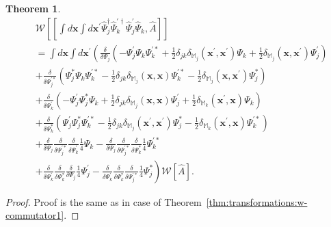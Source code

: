 \documentclass[12pt,aip,jmp,amssymb,amsmath]{revtex4-1}
\newtheorem{theorem}{Theorem}
\begin{document}
\begin{theorem}
\label{thm:transformations:w-commutator2}
    \begin{eqnarray*}
        & \mathcal{W} \left[
            [
                \int d\boldsymbol{x} \int d\boldsymbol{x}^\prime
                \hat{\Psi}_j^\dagger \hat{\Psi}_k^{\prime\dagger} \hat{\Psi}_j^\prime \hat{\Psi}_k,
                \hat{A}
            ]
        \right] \\
        & = \int d\boldsymbol{x} \int d\boldsymbol{x}^\prime \left(
            \frac{\delta}{\delta \Psi_j} \left(
                - \Psi_j^\prime \Psi_k \Psi_k^{\prime*}
                + \frac{1}{2} \delta_{jk} \delta_{\mathbb{M}_j}(\boldsymbol{x}^\prime, \boldsymbol{x}^\prime) \Psi_k
                + \frac{1}{2} \delta_{\mathbb{M}_j}(\boldsymbol{x}, \boldsymbol{x}^\prime) \Psi_j^\prime
            \right) \right . \\
        &   \left. + \frac{\delta}{\delta \Psi_j^{\prime*}} \left(
                \Psi_j^* \Psi_k \Psi_k^{\prime*}
                - \frac{1}{2} \delta_{jk} \delta_{\mathbb{M}_j}(\boldsymbol{x}, \boldsymbol{x}) \Psi_k^{\prime*}
                - \frac{1}{2} \delta_{\mathbb{M}_j}(\boldsymbol{x}, \boldsymbol{x}^\prime) \Psi_j^*
            \right) \right. \\
        &   \left. + \frac{\delta}{\delta \Psi_k^\prime} \left(
                - \Psi_j^\prime \Psi_j^* \Psi_k
                + \frac{1}{2} \delta_{jk} \delta_{\mathbb{M}_j}(\boldsymbol{x}, \boldsymbol{x}) \Psi_j^\prime
                + \frac{1}{2} \delta_{\mathbb{M}_k}(\boldsymbol{x}^\prime, \boldsymbol{x}) \Psi_k
            \right) \right .\\
        &   \left. + \frac{\delta}{\delta \Psi_k^*} \left(
                \Psi_j^\prime \Psi_j^* \Psi_k^{\prime*}
                - \frac{1}{2} \delta_{jk} \delta_{\mathbb{M}_j}(\boldsymbol{x}^\prime, \boldsymbol{x}^\prime) \Psi_j^*
                - \frac{1}{2} \delta_{\mathbb{M}_k}(\boldsymbol{x}^\prime, \boldsymbol{x}) \Psi_k^{\prime*}
            \right) \right. \\
        &   \left.
                + \frac{\delta}{\delta \Psi_j}
                \frac{\delta}{\delta \Psi_j^{\prime*}}
                \frac{\delta}{\delta \Psi_k^\prime}
                \frac{1}{4} \Psi_k
                - \frac{\delta}{\delta \Psi_j}
                \frac{\delta}{\delta \Psi_j^{\prime*}}
                \frac{\delta}{\delta \Psi_k^*}
                \frac{1}{4} \Psi_k^{\prime*}
            \right. \\
        &   \left.
                + \frac{\delta}{\delta \Psi_k^\prime}
                \frac{\delta}{\delta \Psi_k^*}
                \frac{\delta}{\delta \Psi_j}
                \frac{1}{4} \Psi_j^\prime
                - \frac{\delta}{\delta \Psi_k^\prime}
                \frac{\delta}{\delta \Psi_k^*}
                \frac{\delta}{\delta \Psi_j^{\prime*}}
                \frac{1}{4} \Psi_j^*
        \right) \mathcal{W}[\hat{A}].
    \end{eqnarray*}
\end{theorem}
\begin{proof}
Proof is the same as in case of Theorem~\ref{thm:transformations:w-commutator1}.
\end{proof}
\end{document}
